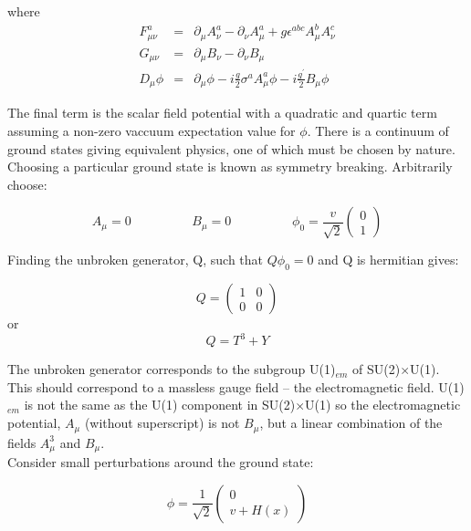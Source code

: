 where
\begin{eqnarray}
F_{\mu\nu}^{a} &=& \partial_{\mu}A_{\nu}^{a} - \partial_{\nu}A_{\mu}^{a} +
g\epsilon^{abc}A_{\mu}^{b}A_{\nu}^{c} \\
G_{\mu\nu} &=& \partial_{\mu}B_{\nu} - \partial_{\nu}B_{\mu} \\
D_{\mu}\phi &=& \partial_{\mu}\phi - i\frac{g}{2}\sigma^{a}A_{\mu}^{a}\phi -
i\frac{g^{\prime}}{2}B_{\mu}\phi
\end{eqnarray}

The final term is the scalar field potential with a quadratic and quartic term
assuming a non-zero vaccuum expectation value for $\phi$. There is a 
continuum of ground states giving equivalent physics, one of which must be 
chosen by nature. Choosing a particular ground state is known as symmetry 
breaking. Arbitrarily choose:

\begin{equation}
A_{\mu} = 0 \hspace{2cm} B_{\mu} = 0 \hspace{2cm} \phi_{0} =
\frac{v}{\sqrt{2}}\left(\begin{array}{c}0\\1\end{array}\right)
\end{equation}

Finding the unbroken generator, Q, such that $Q\phi_{0} = 0$ and Q is hermitian
gives:

\begin{equation}
Q = \left(\begin{array}{cc}1&0\\0&0\end{array}\right)
\end{equation}
or
\begin{equation}
Q = T^{3} + Y 
\end{equation}

The unbroken generator corresponds to the subgroup U(1)$_{em}$ of
SU(2)$\times$U(1). This should correspond to a massless gauge field -- the
electromagnetic field. U(1)$_{em}$ is not the same as the U(1) component in
SU(2)$\times$U(1) so the electromagnetic potential, $A_{\mu}$ (without
superscript) is not $B_{\mu}$, but a linear combination of the fields
$A_{\mu}^{3}$ and $B_{\mu}$. \\

Consider small perturbations around the ground state:

\begin{equation}
\phi = \frac{1}{\sqrt{2}} \left(
\begin{array}{c}
0 \\ 
v + H(x)
\end{array}
\right)
\end{equation}

